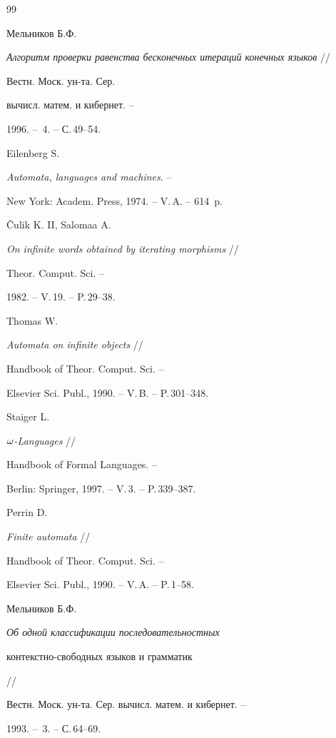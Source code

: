 \begin{thebibliography}{99}


 Мельников Б.Ф.


{\em Алгоритм проверки равенства бесконечных итераций конечных языков} // 


 Вестн. Моск. ун-та. Сер.


вычисл. матем. и кибернет. --


 1996. -- \No\,4. -- С.\,49--54.







 Eilenberg S.


{\em Automata, languages and machines}. --


 New York: Academ. Press, 1974. -- V.\,A. -- 614~p.







 \v{C}ulik K. II, Salomaa A.


{\em On infinite words obtained by iterating morphisms} //


 Theor. Comput. Sci. --


 1982. -- V.\,19. -- P.\,29--38.







 Thomas W.


{\em Automata on infinite objects} // 


 Handbook of Theor. Comput. Sci. --


 Elsevier Sci. Publ., 1990. -- V.\,B. -- P.\,301--348.







 Staiger L.


{\em {\large $\omega$}-Languages} // 


 Handbook of Formal Languages. --


 Berlin: Springer, 1997. -- V.\,3. -- P.\,339--387.







 Perrin D.


{\em Finite automata} // 


 Handbook of Theor. Comput. Sci. --


 Elsevier Sci. Publ., 1990. -- V.\,A. -- P.\,1--58.







 Мельников Б.Ф.


{\em Об одной классификации последовательностных


 контекстно-свободных языков и грамматик} //


 Вестн. Моск. ун-та. Сер. вычисл. матем. и кибернет. --


 1993. -- \No\,3. -- С.\,64--69.





\end{thebibliography}
